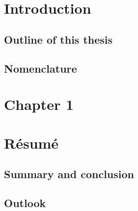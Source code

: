 \documentclass[twoside,a4paper]{article}
\begin{document}
\section{Introduction}

\subsection{Outline of this thesis}

\subsection{Nomenclature}

%
%
\newpage
\section{Chapter 1}

%
%
\clearpage\newpage\null %
\newpage
\section{R\'esum\'e}
\subsection{Summary and conclusion}

\subsection{Outlook}
\end{document}
